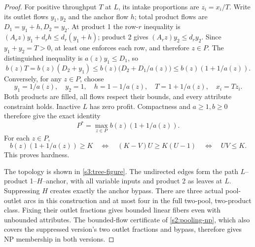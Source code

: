 \begin{proof}
For positive throughput $T$ at $L$, its intake proportions are $z_i=x_i/T$.
Write its outlet flows $y_1,y_2$ and the anchor flow $h$; total product
flows are $D_1=y_1+h,D_2=y_2$. At product 1 the row-$r$ inequality is
$(A_rz)y_1+d_rh\le d_r(y_1+h)$; product 2 gives
$(A_rz)y_2\le d_ry_2$. Since $y_1+y_2=T>0$, at least one enforces
each row, and therefore $z\in P$. The distinguished inequality is
$a(z)y_1\le D_1$, so
\[
 b(z)T=b(z)(D_2+y_1)
 \le b(z)\bigl(D_2+D_1/a(z)\bigr)
 \le b(z)(1+1/a(z)).
\]
Conversely, for any $z\in P$, choose
\begin{equation}
 y_1=1/a(z),\quad y_2=1,\quad h=1-1/a(z),\quad
 T=1+1/a(z),\quad x_i=Tz_i.\label{s3:radial-max}
\end{equation}
Both products are filled, all flows respect their bounds, and every
attribute constraint holds. Inactive $L$ has zero profit. Compactness
and $a\ge1,b\ge0$ therefore give the exact identity
\begin{equation}
 P^*=\max_{z\in P}b(z)(1+1/a(z)).\label{s3:two-pool-value}
\end{equation}
For each $z\in P$,
\begin{equation}
 b(z)(1+1/a(z))\ge K
 \quad\Longleftrightarrow\quad
 (K-V)U\ge K(U-1)
 \quad\Longleftrightarrow\quad UV\le K.\label{s3:threshold-product}
\end{equation}
This proves hardness.

The topology is shown in \cref{s3:tree-figure}. The undirected edges form
the path $L$--product 1--$H$--anchor, with all variable inputs and product 2
as leaves at $L$. Suppressing $H$ creates exactly the anchor bypass.
There are three actual pool-outlet arcs in this construction and at
most four in the full two-pool, two-product class. Fixing their outlet
fractions gives bounded linear fibers even with unbounded attributes.
The bounded-flow certificate of \cref{s2:pooling-np}, which also covers
the suppressed version's two outlet fractions and bypass, therefore
gives NP membership in both versions.
\end{proof}

